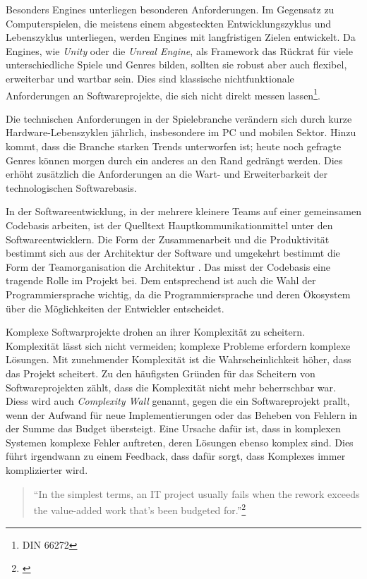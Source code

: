 Besonders Engines unterliegen besonderen Anforderungen. Im Gegensatz zu Computerspielen, die meistens einem abgesteckten Entwicklungszyklus und Lebenszyklus unterliegen, werden Engines mit langfristigen Zielen entwickelt. Da Engines, wie \textit{Unity} oder die \textit{Unreal Engine}, als Framework das Rückrat für viele unterschiedliche Spiele und Genres bilden, sollten sie robust aber auch flexibel, erweiterbar und wartbar sein. Dies sind klassische nichtfunktionale Anforderungen an Softwareprojekte, die sich nicht direkt messen lassen\footnote{DIN 66272}.

Die technischen Anforderungen in der Spielebranche verändern sich durch kurze Hardware-Lebenszyklen jährlich, insbesondere im PC und mobilen Sektor. Hinzu kommt, dass die Branche starken Trends unterworfen ist; heute noch gefragte Genres können morgen durch ein anderes an den Rand gedrängt werden. Dies erhöht zusätzlich die Anforderungen an die Wart- und Erweiterbarkeit der technologischen Softwarebasis.

In der Softwareentwicklung, in der mehrere kleinere Teams auf einer gemeinsamen Codebasis arbeiten, ist der Quelltext Hauptkommunikationmittel unter den Softwareentwicklern. Die Form der Zusammenarbeit und die Produktivität bestimmt sich aus der Architektur der Software und umgekehrt bestimmt die Form der Teamorganisation die Architektur \parencite[Foreword, Seite xix u. Kapitel 1, Seite 13f]{Martin2008}. Das misst der Codebasis eine tragende Rolle im Projekt bei. Dem entsprechend ist auch die Wahl der Programmiersprache wichtig, da die Programmiersprache und deren Ökosystem über die Möglichkeiten der Entwickler entscheidet.

Komplexe Softwarprojekte drohen an ihrer Komplexität zu scheitern. Komplexität lässt sich nicht vermeiden; komplexe Probleme erfordern komplexe Lösungen. Mit zunehmender Komplexität ist die Wahrscheinlichkeit höher, dass das Projekt scheitert. Zu den häufigsten Gründen für das Scheitern von Softwareprojekten zählt, dass die Komplexität nicht mehr beherrschbar war. Diess wird auch \textit{Complexity Wall} genannt, gegen die ein Softwareprojekt prallt, wenn der Aufwand für neue Implementierungen oder das Beheben von Fehlern in der Summe das Budget übersteigt. Eine Ursache dafür ist, dass in komplexen Systemen komplexe Fehler auftreten, deren Lösungen ebenso komplex sind. Dies führt irgendwann zu einem Feedback, dass dafür sorgt, dass Komplexes immer komplizierter wird.

\begin{quote}
"`In the simplest terms, an IT project usually fails when the rework exceeds the value-added work that's been budgeted for."'\footnote{\parencite[Vgl. Abschnitt: "`Why do projects fail so often?"']{Charette2005}}
\end{quote}



